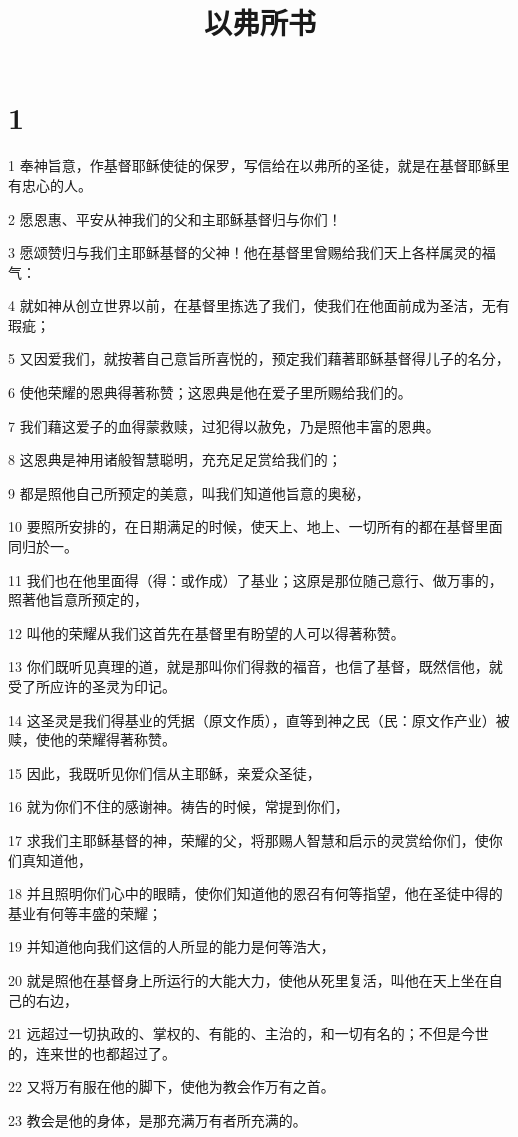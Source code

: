 

\title{以弗所书}


\chapter{1}

\par 1 奉神旨意，作基督耶稣使徒的保罗，写信给在以弗所的圣徒，就是在基督耶稣里有忠心的人。
\par 2 愿恩惠、平安从神我们的父和主耶稣基督归与你们！
\par 3 愿颂赞归与我们主耶稣基督的父神！他在基督里曾赐给我们天上各样属灵的福气：
\par 4 就如神从创立世界以前，在基督里拣选了我们，使我们在他面前成为圣洁，无有瑕疵；
\par 5 又因爱我们，就按著自己意旨所喜悦的，预定我们藉著耶稣基督得儿子的名分，
\par 6 使他荣耀的恩典得著称赞；这恩典是他在爱子里所赐给我们的。
\par 7 我们藉这爱子的血得蒙救赎，过犯得以赦免，乃是照他丰富的恩典。
\par 8 这恩典是神用诸般智慧聪明，充充足足赏给我们的；
\par 9 都是照他自己所预定的美意，叫我们知道他旨意的奥秘，
\par 10 要照所安排的，在日期满足的时候，使天上、地上、一切所有的都在基督里面同归於一。
\par 11 我们也在他里面得（得：或作成）了基业；这原是那位随己意行、做万事的，照著他旨意所预定的，
\par 12 叫他的荣耀从我们这首先在基督里有盼望的人可以得著称赞。
\par 13 你们既听见真理的道，就是那叫你们得救的福音，也信了基督，既然信他，就受了所应许的圣灵为印记。
\par 14 这圣灵是我们得基业的凭据（原文作质），直等到神之民（民：原文作产业）被赎，使他的荣耀得著称赞。
\par 15 因此，我既听见你们信从主耶稣，亲爱众圣徒，
\par 16 就为你们不住的感谢神。祷告的时候，常提到你们，
\par 17 求我们主耶稣基督的神，荣耀的父，将那赐人智慧和启示的灵赏给你们，使你们真知道他，
\par 18 并且照明你们心中的眼睛，使你们知道他的恩召有何等指望，他在圣徒中得的基业有何等丰盛的荣耀；
\par 19 并知道他向我们这信的人所显的能力是何等浩大，
\par 20 就是照他在基督身上所运行的大能大力，使他从死里复活，叫他在天上坐在自己的右边，
\par 21 远超过一切执政的、掌权的、有能的、主治的，和一切有名的；不但是今世的，连来世的也都超过了。
\par 22 又将万有服在他的脚下，使他为教会作万有之首。
\par 23 教会是他的身体，是那充满万有者所充满的。

